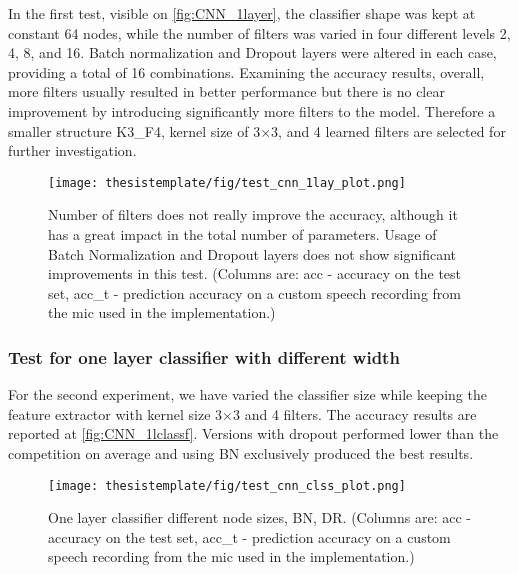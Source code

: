 In the first test, visible on \autoref{fig:CNN_1layer}, the classifier shape was kept at constant 64 nodes, while the number of filters was varied in four different levels 2, 4, 8, and 16. Batch normalization and Dropout layers were altered in each case, providing a total of 16 combinations. Examining the accuracy results, overall, more filters usually resulted in better performance but there is no clear improvement by introducing significantly more filters to the model. Therefore a smaller structure K3\_F4, kernel size of 3$\times$3, and 4 learned filters are selected for further investigation.

\begin{figure}[ht!]
  \begin{center}
    \texttt{[image: thesistemplate/fig/test\_cnn\_1lay\_plot.png]}
    \caption{Number of filters does not really improve the accuracy, although it has a great impact in the total number of parameters. Usage of Batch Normalization and Dropout layers does not show significant improvements in this test. (Columns are: acc - accuracy on the test set, acc\_t - prediction accuracy on a custom speech recording from the mic used in the implementation.)}
    \label{fig:CNN_1layer}
  \end{center}
\end{figure}


\subsubsection{Test for one layer classifier with different width}

For the second experiment, we have varied the classifier size while keeping the feature extractor with kernel size 3$\times$3 and 4 filters. The accuracy results are reported at \autoref{fig:CNN_1lclassf}. Versions with dropout performed lower than the competition on average and using BN exclusively produced the best results. 

\begin{figure}[h!]
  \begin{center}
    \texttt{[image: thesistemplate/fig/test\_cnn\_clss\_plot.png]}
    \caption{One layer classifier different node sizes, BN, DR. (Columns are: acc - accuracy on the test set, acc\_t - prediction accuracy on a custom speech recording from the mic used in the implementation.)}
    \label{fig:CNN_1lclassf}
  \end{center}
\end{figure}


